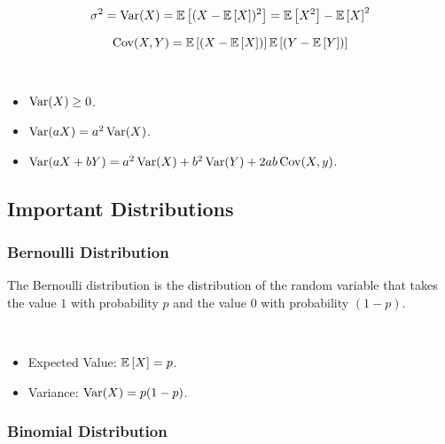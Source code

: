 \documentclass[english, course]{Notes}
\begin{document}
\begin{definition}[Variance]
\[\sigma^2 = \operatorname{Var}(X) = \mathbb{E}\left[(X - \mathbb{E}\left[X\right])^2\right] = \mathbb{E}\left[X^2\right] - \mathbb{E}\left[X\right]^2\]
\end{definition}

\begin{definition}[Covariance]
\[\operatorname{Cov}(X, Y) = \mathbb{E}\left[(X - \mathbb{E}\left[X\right])\right]\mathbb{E}\left[(Y - \mathbb{E}\left[Y\right])\right]\]
\end{definition}

\begin{remark}\ \\	
\begin{itemize}
	\item $\operatorname{Var}(X) \geq 0$.
	\item $\operatorname{Var}(aX) = a^2\operatorname{Var}(X)$.
	\item $\operatorname{Var}(aX + bY) = a^2\operatorname{Var}(X) + b^2\operatorname{Var}(Y) + 2ab\operatorname{Cov}(X, y)$.
	
\end{itemize}
\end{remark}

\subsection{Important Distributions}

\subsubsection{Bernoulli Distribution}

\begin{remark}
The Bernoulli distribution is the distribution of the random variable that takes the value $1$ with probability $p$ and the value $0$ with probability $(1-p)$.
\end{remark}

\begin{fact}\ \\
\begin{itemize}
	\item Expected Value: $\mathbb{E}\left[X\right] = p$.
	\item Variance: $\operatorname{Var}(X) = p(1-p)$.
\end{itemize}
\end{fact}

\subsubsection{Binomial Distribution}
\end{document}
